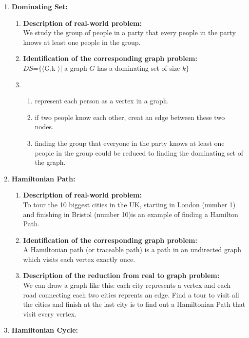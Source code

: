 \documentclass[article, 10pt,onecolumn]{article}
\begin{document}
\begin{enumerate}
\begin{enumerate}
\end{enumerate}
\item \textbf{Dominating Set:} 
	\begin{enumerate}
		\item\textbf{Description of real-world problem:}\\ 
   		We study the group of people in a party that every people in the party knows at least one people in the group. 
  	\item\textbf{Identification of the corresponding graph problem:}\\
  		$DS$=$\{\langle $G,k $ \rangle | $ a graph $G$ has a dominating set of size $k\}$
  	\item
  		\begin{enumerate}
				\item represent each person as a vertex in a graph.
				\item if two people know each other, creat an edge between these two nodes.
				\item finding the group that everyone in the party knows at least one people in the group could be reduced to finding the dominating set of the graph.
			\end{enumerate}
	\end{enumerate}
\item \textbf{Hamiltonian Path:} 
\begin{enumerate}
	\item \textbf{Description of real-world problem:}\\
    To tour the 10 biggest cities in the UK, starting in London (number 1) and finishing in Bristol (number 10)is an example of finding a
    Hamilton Path.~\cite{path}
   \item \textbf{Identification of the corresponding graph problem:}\\
    A Hamiltonian path (or traceable path) is a path in an undirected graph which visits each vertex exactly once. 
   \item \textbf{Description of the reduction from real to graph problem:}\\
   We can draw a graph like this: each city represents a vertex and each road connecting each two cities reprents an edge. Find a tour to visit all the cities and finish at the last city is to find out a Hamiltonian Path that visit every vertex.
 \end{enumerate}  
\item \textbf{Hamiltonian Cycle:} 
\begin{enumerate}

\end{enumerate}
\end{enumerate}
\end{document}
